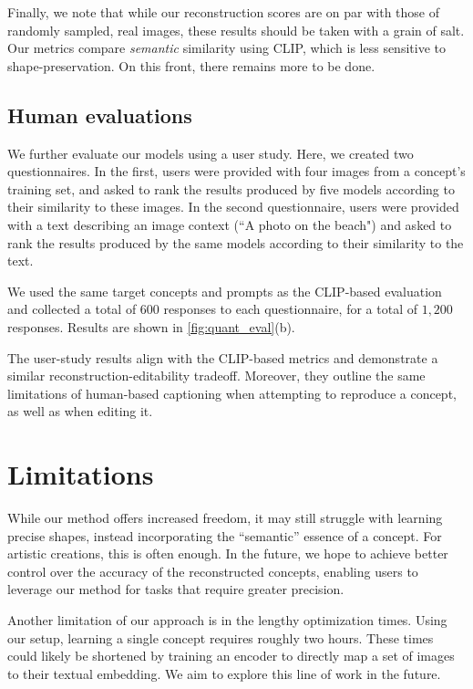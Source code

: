Finally, we note that while our reconstruction scores are on par with those of randomly sampled, real images, these results should be taken with a grain of salt. Our metrics compare \textit{semantic} similarity using CLIP, which is less sensitive to shape-preservation. On this front, there remains more to be done.

\subsection{Human evaluations}

We further evaluate our models using a user study. Here, we created two questionnaires. In the first, users were provided with four images from a concept's training set, and asked to rank the results produced by five models according to their similarity to these images. In the second questionnaire, users were provided with a text describing an image context (``A photo on the beach") and asked to rank the results produced by the same models according to their similarity to the text.

We used the same target concepts and prompts as the CLIP-based evaluation and collected a total of $600$ responses to each questionnaire, for a total of $1,200$ responses. Results are shown in \ref{fig:quant_eval}(b).

The user-study results align with the CLIP-based metrics and demonstrate a similar reconstruction-editability tradeoff. Moreover, they outline the same limitations of human-based captioning when attempting to reproduce a concept, as well as when editing it.

\section{Limitations}
While our method offers increased freedom, it may still struggle with learning precise shapes, instead incorporating the ``semantic'' essence of a concept. For artistic creations, this is often enough. In the future, we hope to achieve better control over the accuracy of the reconstructed concepts, enabling users to leverage our method for tasks that require greater precision.

Another limitation of our approach is in the lengthy optimization times. Using our setup, learning a single concept requires roughly two hours. These times could likely be shortened by training an encoder to directly map a set of images to their textual embedding. We aim to explore this line of work in the future.


